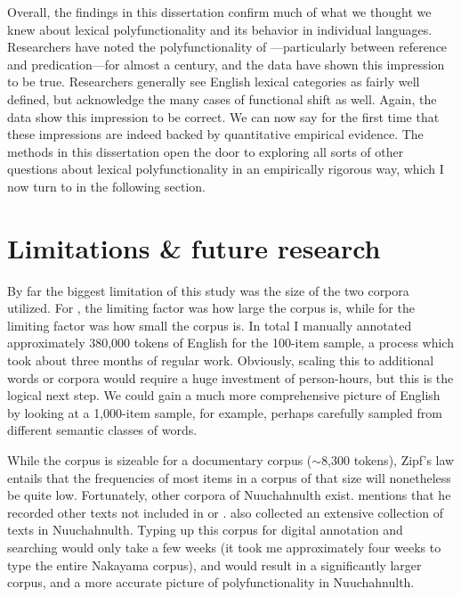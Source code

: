 Overall, the findings in this dissertation confirm much of what we thought we knew about lexical polyfunctionality and its behavior in individual languages. Researchers have noted the polyfunctionality of —particularly between reference and predication—for almost a century, and the data have shown this impression to be true. Researchers generally see English lexical categories as fairly well defined, but acknowledge the many cases of functional shift as well. Again, the data show this impression to be correct. We can now say for the first time that these impressions are indeed backed by quantitative empirical evidence. The methods in this dissertation open the door to exploring all sorts of other questions about lexical polyfunctionality in an empirically rigorous way, which I now turn to in the following section.

\section{Limitations \& future research}
\label{sec:5.4}

By far the biggest limitation of this study was the size of the two corpora utilized. For , the limiting factor was how large the corpus is, while for  the limiting factor was how small the corpus is. In total I manually annotated approximately 380,000 tokens of English for the 100-item sample, a process which took about three months of regular work. Obviously, scaling this to additional words or corpora would require a huge investment of person-hours, but this is the logical next step. We could gain a much more comprehensive picture of English by looking at a 1,000-item sample, for example, perhaps carefully sampled from different semantic classes of words.

While the  corpus is sizeable for a documentary corpus ($\sim$8,300 tokens), Zipf's law entails that the frequencies of most items in a corpus of that size will nonetheless be quite low. Fortunately, other corpora of Nuuchahnulth exist. \textcite{Nakayama2001} mentions that he recorded other texts not included in \textcite{Little2003} or \textcite{Louie2003}. \textcite{SapirSwadesh1939} also collected an extensive collection of texts in Nuuchahnulth. Typing up this corpus for digital annotation and searching would only take a few weeks (it took me approximately four weeks to type the entire Nakayama corpus), and would result in a significantly larger corpus, and a more accurate picture of polyfunctionality in Nuuchahnulth.

